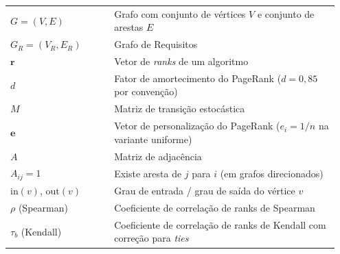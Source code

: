 \begin{longtable}{@{}p{0.30\linewidth} p{0.65\linewidth}@{}}
$G = (V,E)$           & Grafo com conjunto de vértices $V$ e conjunto de arestas $E$ \\
$G_R = (V_R, E_R)$    & Grafo de Requisitos \\
$\mathbf{r}$          & Vetor de \emph{ranks} de um algoritmo \\
$d$                   & Fator de amortecimento do PageRank ($d=0{,}85$ por convenção) \\
$M$                   & Matriz de transição estocástica \\
$\mathbf{e}$          & Vetor de personalização do PageRank ($e_i = 1/n$ na variante uniforme) \\
$A$                   & Matriz de adjacência \\
$A_{ij} = 1$          & Existe aresta de $j$ para $i$ (em grafos direcionados) \\
$\text{in}(v)$, $\text{out}(v)$ & Grau de entrada / grau de saída do vértice $v$ \\
$\rho$ (Spearman)     & Coeficiente de correlação de ranks de Spearman \\
$\tau_b$ (Kendall)    & Coeficiente de correlação de ranks de Kendall com correção para \emph{ties} \\
\bottomrule
\end{longtable}
